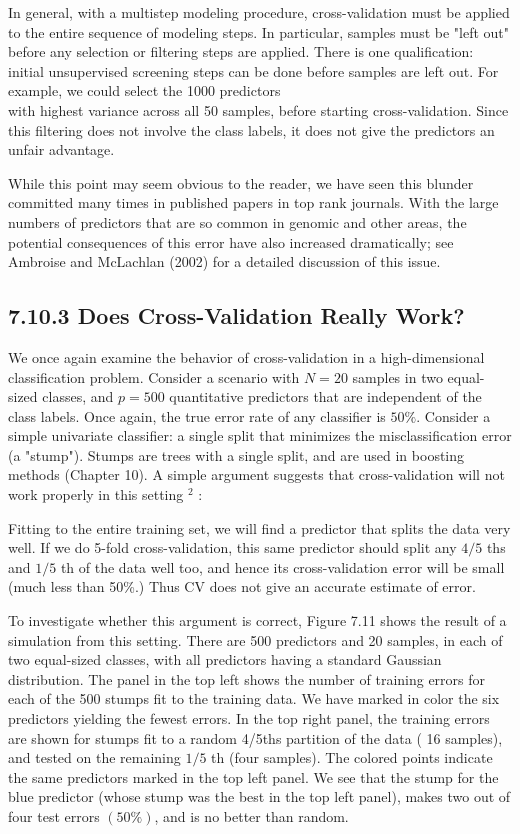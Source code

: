 \documentclass[10pt]{article}
\begin{document}
In general, with a multistep modeling procedure, cross-validation must be applied to the entire sequence of modeling steps. In particular, samples must be "left out" before any selection or filtering steps are applied. There is one qualification: initial unsupervised screening steps can be done before samples are left out. For example, we could select the 1000 predictors\\
with highest variance across all 50 samples, before starting cross-validation. Since this filtering does not involve the class labels, it does not give the predictors an unfair advantage.

While this point may seem obvious to the reader, we have seen this blunder committed many times in published papers in top rank journals. With the large numbers of predictors that are so common in genomic and other areas, the potential consequences of this error have also increased dramatically; see Ambroise and McLachlan (2002) for a detailed discussion of this issue.

\subsection*{7.10.3 Does Cross-Validation Really Work?}
We once again examine the behavior of cross-validation in a high-dimensional classification problem. Consider a scenario with $N=20$ samples in two equal-sized classes, and $p=500$ quantitative predictors that are independent of the class labels. Once again, the true error rate of any classifier is $50 \%$. Consider a simple univariate classifier: a single split that minimizes the misclassification error (a "stump"). Stumps are trees with a single split, and are used in boosting methods (Chapter 10). A simple argument suggests that cross-validation will not work properly in this setting ${ }^{2}$ :

\begin{displayquote}
Fitting to the entire training set, we will find a predictor that splits the data very well. If we do 5-fold cross-validation, this same predictor should split any $4 / 5$ ths and $1 / 5$ th of the data well too, and hence its cross-validation error will be small (much less than 50\%.) Thus CV does not give an accurate estimate of error.
\end{displayquote}

To investigate whether this argument is correct, Figure 7.11 shows the result of a simulation from this setting. There are 500 predictors and 20 samples, in each of two equal-sized classes, with all predictors having a standard Gaussian distribution. The panel in the top left shows the number of training errors for each of the 500 stumps fit to the training data. We have marked in color the six predictors yielding the fewest errors. In the top right panel, the training errors are shown for stumps fit to a random 4/5ths partition of the data ( 16 samples), and tested on the remaining $1 / 5$ th (four samples). The colored points indicate the same predictors marked in the top left panel. We see that the stump for the blue predictor (whose stump was the best in the top left panel), makes two out of four test errors $(50 \%)$, and is no better than random.
\end{document}
